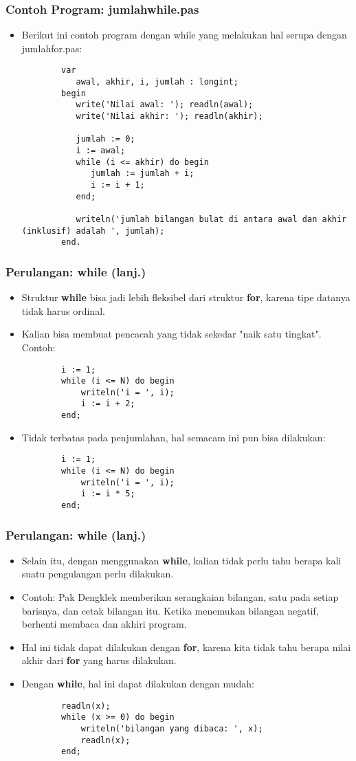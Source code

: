 \documentclass{beamer}
\begin{document}
\begin{frame}[fragile]
\frametitle{Contoh Program: jumlahwhile.pas}
\begin{itemize}
	\item Berikut ini contoh program dengan while yang melakukan hal serupa dengan jumlahfor.pas:
	\begin{lstlisting}
		var
		   awal, akhir, i, jumlah : longint;
		begin
		   write('Nilai awal: '); readln(awal);
		   write('Nilai akhir: '); readln(akhir);
		
		   jumlah := 0;
		   i := awal;
		   while (i <= akhir) do begin
		      jumlah := jumlah + i;
		      i := i + 1;
		   end;
		
		   writeln('jumlah bilangan bulat di antara awal dan akhir (inklusif) adalah ', jumlah);
		end.
	\end{lstlisting}
\end{itemize}
\end{frame}

\begin{frame}[fragile]
\frametitle{Perulangan: while (lanj.)} 
\begin{itemize}
	\item Struktur \textbf{while} bisa jadi lebih fleksibel dari struktur \textbf{for}, karena tipe datanya tidak harus ordinal.
	\item Kalian bisa membuat pencacah yang tidak sekedar "naik satu tingkat". Contoh:
	\begin{lstlisting}
		i := 1;
		while (i <= N) do begin
		    writeln('i = ', i);
		    i := i + 2;
		end;
	\end{lstlisting}
	
	\item Tidak terbatas pada penjumlahan, hal semacam ini pun bisa dilakukan:
	\begin{lstlisting}
		i := 1;
		while (i <= N) do begin
		    writeln('i = ', i);
		    i := i * 5;
		end;
	\end{lstlisting}
\end{itemize}
\end{frame}

\begin{frame}[fragile]
\frametitle{Perulangan: while (lanj.)} 
\begin{itemize}
	\item Selain itu, dengan menggunakan \textbf{while}, kalian tidak perlu tahu berapa kali suatu pengulangan perlu dilakukan.
	\item Contoh: Pak Dengklek memberikan serangkaian bilangan, satu pada setiap barisnya, dan cetak bilangan itu. Ketika menemukan bilangan negatif, berhenti membaca dan akhiri program.
	\item Hal ini tidak dapat dilakukan dengan \textbf{for}, karena kita tidak tahu berapa nilai akhir dari \textbf{for} yang harus dilakukan.
	\item Dengan \textbf{while}, hal ini dapat dilakukan dengan mudah:
	\begin{lstlisting}
		readln(x);
		while (x >= 0) do begin
		    writeln('bilangan yang dibaca: ', x);
		    readln(x);
		end;
	\end{lstlisting}
\end{itemize}
\end{frame}
\end{document}
